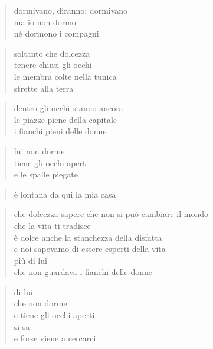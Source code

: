 \clearpage


\begin{verse}
    dormivano, diranno: dormivano\\
    ma io non dormo\\
    né dormono i compagni
\end{verse}

\begin{verse}
    soltanto che dolcezza\\
    tenere chiusi gli occhi\\
    le membra colte nella tunica\\
    strette alla terra
\end{verse}

\begin{verse}
    dentro gli occhi stanno ancora\\
    le piazze piene della capitale\\
    i fianchi pieni delle donne
\end{verse}

\begin{verse}
    lui non dorme\\
    tiene gli occhi aperti\\
    e le spalle piegate
\end{verse}

\begin{verse}
    è lontana da qui la mia casa
\end{verse}

\begin{verse}
    che dolcezza sapere che non si può cambiare il mondo\\
    che la vita ti tradisce \\
    è dolce anche la stanchezza della disfatta\\
    e noi sapevamo di essere esperti della vita\\
    più di lui\\
    che non guardava i fianchi delle donne
\end{verse}

\begin{verse}
    di lui\\
    che non dorme\\
    e tiene gli occhi aperti\\
    si sa\\
    e forse viene a cercarci
\end{verse}

